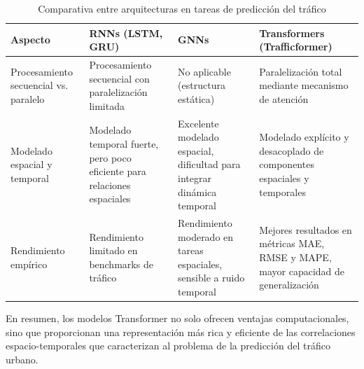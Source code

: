 \begin{table}[H]
	\centering
	\caption{Comparativa entre arquitecturas en tareas de predicción del tráfico}
	\label{tab:comparativa_modelos}
	\renewcommand{\arraystretch}{1.4}
	\begin{tabular}{p{3.5cm} p{3.5cm} p{3.5cm} p{4cm}}
		\toprule
		\textbf{Aspecto} & \textbf{RNNs (LSTM, GRU)} & \textbf{GNNs} & \textbf{Transformers (Trafficformer)} \\
		\midrule
		Procesamiento secuencial vs. paralelo &
		Procesamiento secuencial con paralelización limitada &
		No aplicable (estructura estática) &
		Paralelización total mediante mecanismo de atención \\
		
		\midrule
		Modelado espacial y temporal &
		Modelado temporal fuerte, pero poco eficiente para relaciones espaciales &
		Excelente modelado espacial, dificultad para integrar dinámica temporal &
		Modelado explícito y desacoplado de componentes espaciales y temporales \\
		
		\midrule
		Rendimiento empírico &
		Rendimiento limitado en benchmarks de tráfico &
		Rendimiento moderado en tareas espaciales, sensible a ruido temporal &
		Mejores resultados en métricas MAE, RMSE y MAPE, mayor capacidad de generalización \\
		\bottomrule
	\end{tabular}
\end{table}


En resumen, los modelos Transformer no solo ofrecen ventajas computacionales, sino que proporcionan una representación más rica y eficiente de las correlaciones espacio-temporales que caracterizan al problema de la predicción del tráfico urbano. 